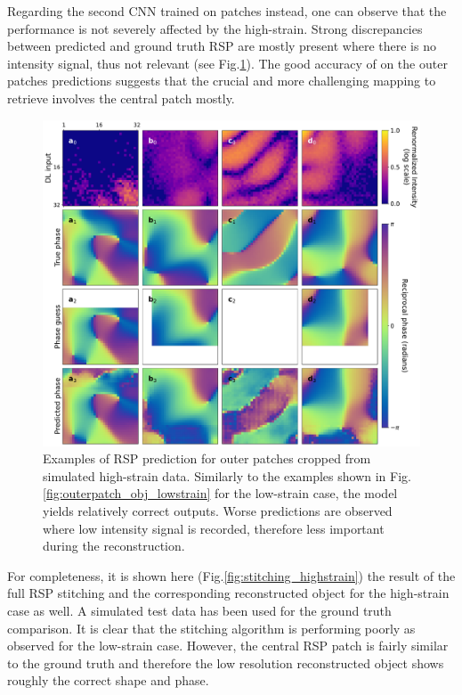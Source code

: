 Regarding the second CNN trained on patches instead, one can observe that the performance is not severely affected by the 
high-strain. Strong discrepancies between predicted and ground truth RSP are mostly present where there is no intensity signal, 
thus not relevant (see Fig.\ref{fig:outer_highstrain}). The good accuracy of on the outer patches predictions suggests 
that the crucial and more challenging mapping to retrieve involves the central patch mostly. 
\begin{figure}[H]
    \centering
    \includegraphics[width=\textwidth]{figures/Phasing/outer_patches_high_strain_RSP.pdf}
    \caption{Examples of RSP prediction for outer patches cropped from simulated high-strain data. Similarly to 
    the examples shown in Fig. \ref{fig:outerpatch_obj_lowstrain} for the low-strain case, the model yields relatively 
    correct outputs. Worse predictions are observed where low intensity signal is recorded, therefore less important 
    during the reconstruction.}
    \label{fig:outer_highstrain}
\end{figure}

For completeness, it is shown here (Fig.\ref{fig:stitching_highstrain}) the result of the full RSP stitching and the corresponding reconstructed object for 
the high-strain case as well. A simulated test data has been used for the ground truth comparison. It is clear that the 
stitching algorithm is performing poorly as observed for the low-strain case. However, the central RSP patch is fairly 
similar to the ground truth and therefore the low resolution reconstructed object shows roughly the correct shape and 
phase. 

